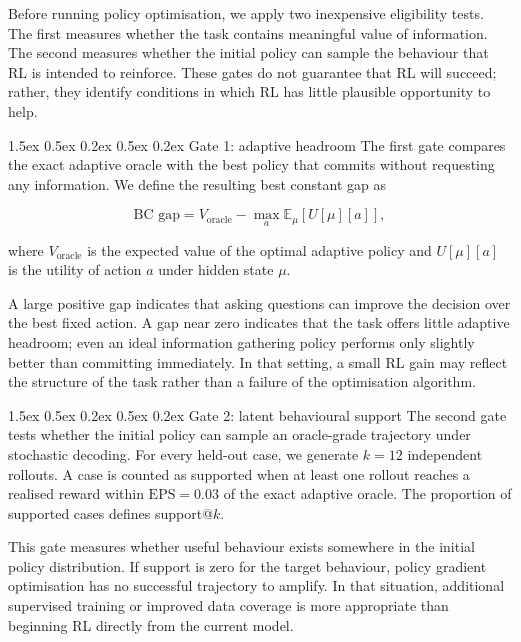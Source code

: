 \documentclass{article}
\makeatletter
\renewcommand{\paragraph}{%
  \@startsection{paragraph}{4}{\z@}%
                {1.5ex \@plus 0.5ex \@minus 0.2ex}%
                {0.5ex \@plus 0.2ex}%
                {\normalsize\bf}}
\makeatother
\begin{document}
Before running policy optimisation, we apply two inexpensive eligibility tests. The
first measures whether the task contains meaningful value of information. The
second measures whether the initial policy can sample the behaviour that RL is
intended to reinforce. These gates do not guarantee that RL will succeed; rather,
they identify conditions in which RL has little plausible opportunity to help.

\paragraph{Gate 1: adaptive headroom}
The first gate compares the exact adaptive oracle with the best policy that commits
without requesting any information. We define the resulting best constant gap as

\[
\text{BC gap}
=
V_{\text{oracle}}
-
\max_a \mathbb{E}_{\mu}\!\left[U[\mu][a]\right],
\]

where $V_{\text{oracle}}$ is the expected value of the optimal adaptive policy and
$U[\mu][a]$ is the utility of action $a$ under hidden state $\mu$.

A large positive gap indicates that asking questions can improve the decision over
the best fixed action. A gap near zero indicates that the task offers little
adaptive headroom; even an ideal information gathering policy performs only
slightly better than committing immediately. In that setting, a small RL gain may
reflect the structure of the task rather than a failure of the optimisation
algorithm.

\paragraph{Gate 2: latent behavioural support}
The second gate tests whether the initial policy can sample an oracle-grade
trajectory under stochastic decoding. For every held-out case, we generate
$k{=}12$ independent rollouts. A case is counted as supported when at least one
rollout reaches a realised reward within $\text{EPS}{=}0.03$ of the exact adaptive
oracle. The proportion of supported cases defines support@$k$.

This gate measures whether useful behaviour exists somewhere in the initial policy
distribution. If support is zero for the target behaviour, policy gradient
optimisation has no successful trajectory to amplify. In that situation, additional
supervised training or improved data coverage is more appropriate than beginning
RL directly from the current model.
\end{document}
